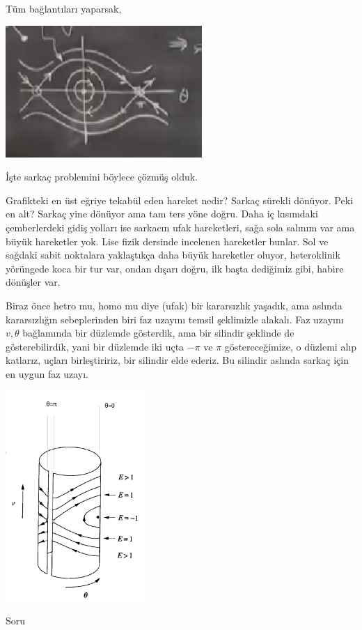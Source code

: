 \documentclass[12pt,fleqn]{article}\usepackage{../../common}
\begin{document}
Tüm bağlantıları yaparsak, 

\includegraphics[height=5cm]{07_17.png}

İşte sarkaç problemini böylece çözmüş olduk.

Grafikteki en üst eğriye tekabül eden hareket nedir? Sarkaç sürekli
dönüyor. Peki en alt? Sarkaç yine dönüyor ama tam ters yöne doğru. Daha iç
kısımdaki çemberlerdeki gidiş yolları ise sarkacın ufak hareketleri, sağa sola
salınım var ama büyük hareketler yok. Lise fizik dersinde incelenen hareketler
bunlar. Sol ve sağdaki sabit noktalara yaklaştıkça daha büyük hareketler oluyor,
heteroklinik yörüngede koca bir tur var, ondan dışarı doğru, ilk başta dediğimiz
gibi, habire dönüşler var.

Biraz önce hetro mu, homo mu diye (ufak) bir kararsızlık yaşadık, ama aslında
kararsızlığın sebeplerinden biri faz uzayını temsil şeklimizle alakalı. Faz
uzayını $v,\theta$ bağlamında bir düzlemde gösterdik, ama bir silindir şeklinde
de gösterebilirdik, yani bir düzlemde iki uçta $-\pi$ ve $\pi$ göstereceğimize,
o düzlemi alıp katlarız, uçları birleştiririz, bir silindir elde ederiz. Bu
silindir aslında sarkaç için en uygun faz uzayı.

\includegraphics[height=8cm]{07_18.png}

Soru
\end{document}
